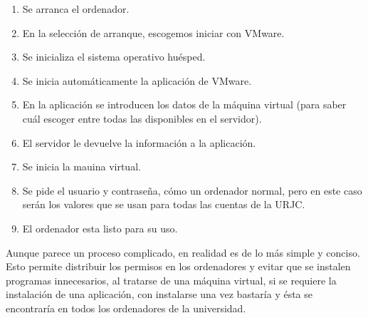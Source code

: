 \begin{enumerate}
\item Se arranca el ordenador.
\item En la selección de arranque, escogemos iniciar con VMware.
\item Se inicializa el sistema operativo huésped.
\item Se inicia automáticamente la aplicación de VMware.
\item En la aplicación se introducen los datos de la máquina virtual (para saber cuál escoger entre todas las disponibles en el servidor).
\item El servidor le devuelve la información a la aplicación.
\item Se inicia la mauina virtual.
\item Se pide el usuario y contraseña, cómo un ordenador normal, pero en este caso serán los valores que se usan para todas las cuentas de la URJC.
\item El ordenador esta listo para su uso.
\end{enumerate}

Aunque parece un proceso complicado, en realidad es de lo más simple y conciso. Esto permite distribuir los permisos en los ordenadores y evitar que se instalen programas innecesarios, al tratarse de una máquina virtual, si se requiere la instalación de una aplicación, con instalarse una vez bastaría y ésta se encontraría en todos los ordenadores de la universidad.
